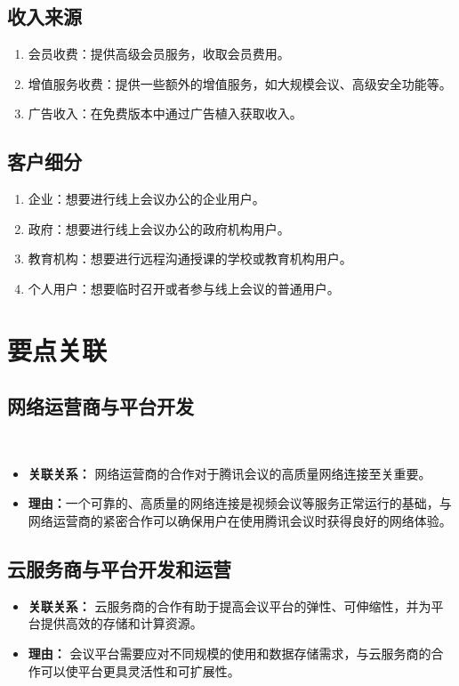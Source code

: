 \documentclass[a4paper,12pt]{article}
\begin{document}
\subsection{收入来源}
\begin{enumerate}
    \item 会员收费：提供高级会员服务，收取会员费用。
    \item 增值服务收费：提供一些额外的增值服务，如大规模会议、高级安全功能等。
    \item 广告收入：在免费版本中通过广告植入获取收入。
\end{enumerate}

\subsection{客户细分}
\begin{enumerate}
    \item 企业：想要进行线上会议办公的企业用户。
    \item 政府：想要进行线上会议办公的政府机构用户。
    \item 教育机构：想要进行远程沟通授课的学校或教育机构用户。
    \item 个人用户：想要临时召开或者参与线上会议的普通用户。
\end{enumerate}


\section{要点关联}
\subsection{网络运营商与平台开发}\
\begin{itemize}
\item \textbf{关联关系：} 网络运营商的合作对于腾讯会议的高质量网络连接至关重要。 
\item \textbf{理由：}一个可靠的、高质量的网络连接是视频会议等服务正常运行的基础，与网络运营商的紧密合作可以确保用户在使用腾讯会议时获得良好的网络体验。
\end{itemize}
\subsection{云服务商与平台开发和运营}
\begin{itemize}
\item\textbf{关联关系：} 云服务商的合作有助于提高会议平台的弹性、可伸缩性，并为平台提供高效的存储和计算资源。 
\item \textbf{理由：} 会议平台需要应对不同规模的使用和数据存储需求，与云服务商的合作可以使平台更具灵活性和可扩展性。
\end{itemize}
\end{document}
